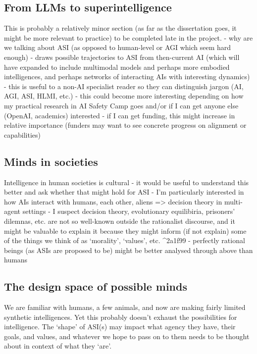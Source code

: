 \documentclass[
]{article}
\begin{document}
\subsection{From LLMs to
superintelligence}\label{from-llms-to-superintelligence}

This is probably a relatively minor section (as far as the dissertation
goes, it might be more relevant to practice) to be completed late in the
project. - why are we talking about ASI (as opposed to human-level or
AGI which seem hard enough) - draws possible trajectories to ASI from
then-current AI (which will have expanded to include multimodal models
and perhaps more embodied intelligences, and perhaps networks of
interacting AIs with interesting dynamics) - this is useful to a non-AI
specialist reader so they can distinguish jargon (AI, AGI, ASI, HLMI,
etc.) - this could become more interesting depending on how my practical
research in AI Safety Camp goes and/or if I can get anyone else (OpenAI,
academics) interested - if I can get funding, this might increase in
relative importance (funders may want to see concrete progress on
alignment or capabilities)

\subsection{Minds in societies}\label{minds-in-societies}

Intelligence in human societies is cultural - it would be useful to
understand this better and ask whether that might hold for ASI - I'm
particularly interested in how AIs interact with humans, each other,
aliens =\textgreater{} decision theory in multi-agent settings - I
suspect decision theory, evolutionary equilibiria, prisoners' dilemnas,
etc. are not so well-known outside the rationalist discourse, and it
might be valuable to explain it because they might inform (if not
explain) some of the things we think of as `morality', `values', etc.
\^{}2a1f99 - perfectly rational beings (as ASIs are proposed to be)
might be better analysed through above than humans

\subsection{The design space of possible
minds}\label{the-design-space-of-possible-minds}

We are familiar with humans, a few animals, and now are making fairly
limited synthetic intelligences. Yet this probably doesn't exhaust the
possibilities for intelligence. The `shape' of ASI(s) may impact what
agency they have, their goals, and values, and whatever we hope to pass
on to them needs to be thought about in context of what they `are'.
\end{document}
